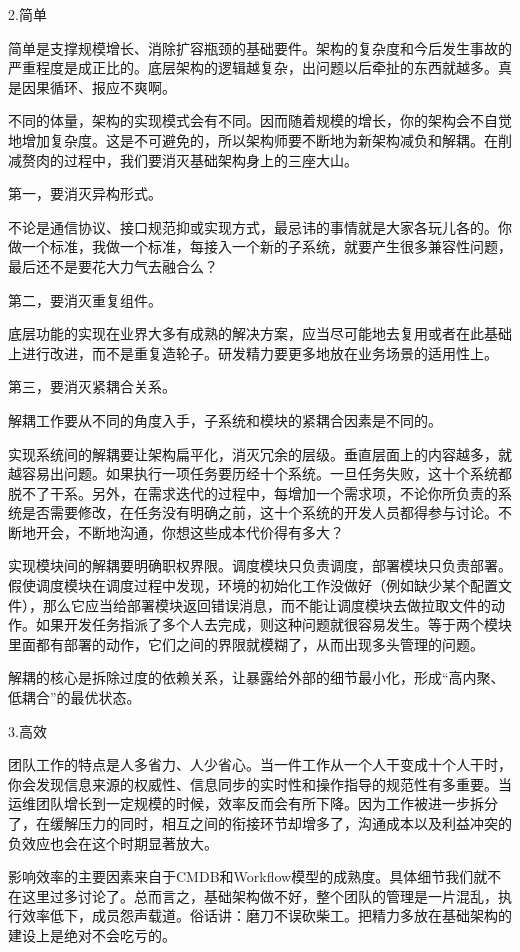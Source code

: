 \documentclass[12pt,UTF8]{ctexbook}
\begin{document}
2.简单

简单是支撑规模增长、消除扩容瓶颈的基础要件。架构的复杂度和今后发生事故的严重程度是成正比的。底层架构的逻辑越复杂，出问题以后牵扯的东西就越多。真是因果循环、报应不爽啊。

不同的体量，架构的实现模式会有不同。因而随着规模的增长，你的架构会不自觉地增加复杂度。这是不可避免的，所以架构师要不断地为新架构减负和解耦。在削减赘肉的过程中，我们要消灭基础架构身上的三座大山。

第一，要消灭异构形式。

不论是通信协议、接口规范抑或实现方式，最忌讳的事情就是大家各玩儿各的。你做一个标准，我做一个标准，每接入一个新的子系统，就要产生很多兼容性问题，最后还不是要花大力气去融合么？

第二，要消灭重复组件。

底层功能的实现在业界大多有成熟的解决方案，应当尽可能地去复用或者在此基础上进行改进，而不是重复造轮子。研发精力要更多地放在业务场景的适用性上。

第三，要消灭紧耦合关系。

解耦工作要从不同的角度入手，子系统和模块的紧耦合因素是不同的。

实现系统间的解耦要让架构扁平化，消灭冗余的层级。垂直层面上的内容越多，就越容易出问题。如果执行一项任务要历经十个系统。一旦任务失败，这十个系统都脱不了干系。另外，在需求迭代的过程中，每增加一个需求项，不论你所负责的系统是否需要修改，在任务没有明确之前，这十个系统的开发人员都得参与讨论。不断地开会，不断地沟通，你想这些成本代价得有多大？

实现模块间的解耦要明确职权界限。调度模块只负责调度，部署模块只负责部署。假使调度模块在调度过程中发现，环境的初始化工作没做好（例如缺少某个配置文件），那么它应当给部署模块返回错误消息，而不能让调度模块去做拉取文件的动作。如果开发任务指派了多个人去完成，则这种问题就很容易发生。等于两个模块里面都有部署的动作，它们之间的界限就模糊了，从而出现多头管理的问题。

解耦的核心是拆除过度的依赖关系，让暴露给外部的细节最小化，形成“高内聚、低耦合”的最优状态。

3.高效

团队工作的特点是人多省力、人少省心。当一件工作从一个人干变成十个人干时，你会发现信息来源的权威性、信息同步的实时性和操作指导的规范性有多重要。当运维团队增长到一定规模的时候，效率反而会有所下降。因为工作被进一步拆分了，在缓解压力的同时，相互之间的衔接环节却增多了，沟通成本以及利益冲突的负效应也会在这个时期显著放大。

影响效率的主要因素来自于CMDB和Workflow模型的成熟度。具体细节我们就不在这里过多讨论了。总而言之，基础架构做不好，整个团队的管理是一片混乱，执行效率低下，成员怨声载道。俗话讲：磨刀不误砍柴工。把精力多放在基础架构的建设上是绝对不会吃亏的。
\end{document}
